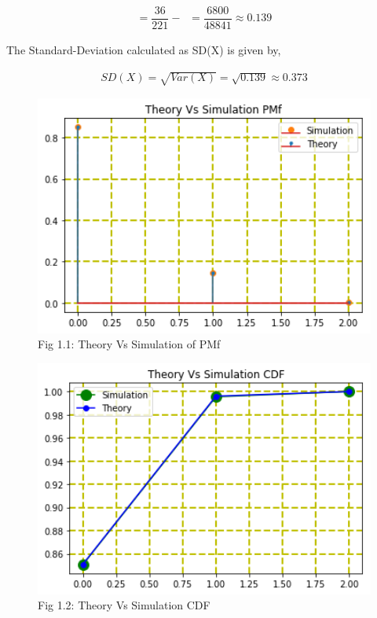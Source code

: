 \documentclass[journal,12pt,twocolumn]{IEEEtran}
\begin{document}
\begin{align*} = \dfrac{36}{221} - \mathop{\Bigg[\dfrac{34}{221}\Bigg]^2} = \dfrac{6800}{48841} \approx 0.139\end{align*}
\newline
\begin{flushleft}The Standard-Deviation calculated as SD(X) is given by,\end{flushleft}
\begin{align}SD(X) = \sqrt{Var(X)} = \sqrt{0.139} \approx 0.373\end{align}
\begin{figure}[h!]
    \includegraphics[width=15cm]{Assignment-5/Codes/Figures/theoryVsSimul_pmf.png}
    \caption*{Fig 1.1: Theory Vs Simulation of PMf}
\end{figure}
\begin{figure}[h!]
    \includegraphics[width=15cm]{Assignment-5/Codes/Figures/theoryVsSimul_cdf.png}
    \caption*{Fig 1.2: Theory Vs Simulation CDF}
\end{figure}
\end{document}
